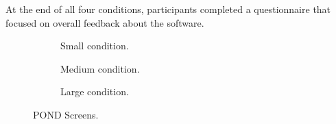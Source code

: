 At the end of all four conditions, participants completed a questionnaire that focused on overall feedback about the software. 
\begin{figure}	
\centering
	\begin{subfigure}[t]{1.25in}
		\centering
		\setlength\fboxsep{0pt}
\setlength\fboxrule{0.5pt}
		\caption{Small condition.}\label{fig:small_cond}
	\end{subfigure}
\quad
\begin{subfigure}[t]{1.25in}
		\centering
		\setlength\fboxsep{0pt}
\setlength\fboxrule{0.5pt}
		\caption{Medium condition. }\label{fig:med_cond}
	\end{subfigure}
\quad
\begin{subfigure}[t]{1.25in}
		\centering
		\setlength\fboxsep{0pt}
\setlength\fboxrule{0.5pt}
		\caption{Large condition. }\label{fig:large_cond}
	\end{subfigure}
	\caption{POND Screens.}\label{fig:3_1}
\end{figure}



